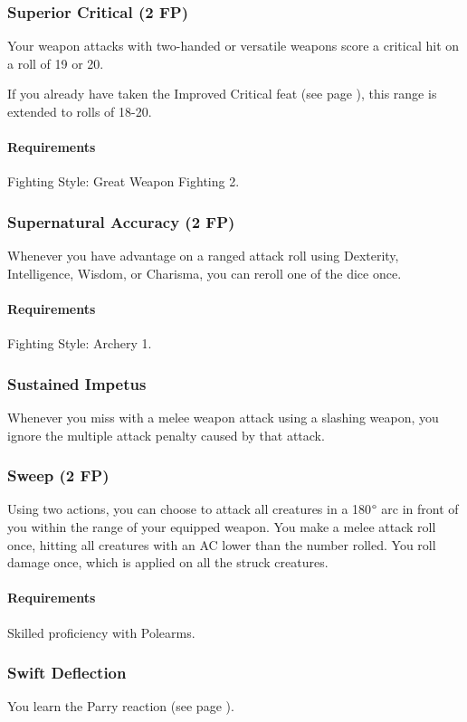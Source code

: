 \subsubsection{Superior Critical (2 FP)} \label{feat::superiorcritical}
    Your weapon attacks with two-handed or versatile weapons score a critical hit on a roll of 19 or 20.

    If you already have taken the Improved Critical feat (see page \pageref{feat::improvedcritical}), this range is extended to rolls of 18-20.
    \paragraph{Requirements} Fighting Style: Great Weapon Fighting 2.
\subsubsection{Supernatural Accuracy (2 FP)} \label{feat::supernaturalaccuracy}
    Whenever you have advantage on a ranged attack roll using Dexterity, Intelligence, Wisdom, or Charisma, you can reroll one of the dice once.
    \paragraph{Requirements} Fighting Style: Archery 1.
\subsubsection{Sustained Impetus} \label{feat::sustainedimpetus}
    Whenever you miss with a melee weapon attack using a slashing weapon, you ignore the multiple attack penalty caused by that attack.
\subsubsection{Sweep (2 FP)} \label{feat::sweep}
    Using two actions, you can choose to attack all creatures in a 180$\degree$ arc in front of you within the range of your equipped weapon.
    You make a melee attack roll once, hitting all creatures with an AC lower than the number rolled.
    You roll damage once, which is applied on all the struck creatures.
    \paragraph{Requirements} Skilled proficiency with Polearms.
\subsubsection{Swift Deflection} \label{feat::swiftdeflection}
    You learn the Parry reaction (see page \pageref{act::parry}).

